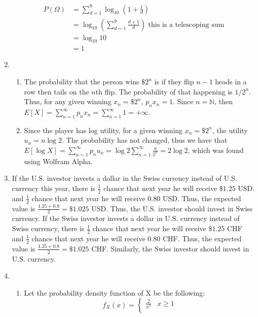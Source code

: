 \documentclass[letterpaper,12pt]{article}
\theoremstyle{definition}
\begin{document}
\begin{enumerate}
      \begin{align*}
        P(\Omega) &= \sum_{d = 1}^9 \log_{10} (1+\frac{1}{d}) \\
        &= \log_{10} (\sum_{d = 1}^9 \frac{d+1}{d}) \text{ this is a telescoping sum} \\
        &= \log_{10} 10 \\
        &= 1
      \end{align*}
  \item
    \begin{enumerate}
      \item
        The probability that the person wins $\$2^n$ is if they flip $n-1$ heads in a row then tails on the $n$th flip. The probability of that happening is $1/2^n$. Thus, for any given winning $x_n = \$2^n$, $p_nx_n = 1$. Since $n = \mathds{N}$, then $E[X] = \sum_{n = 1}^\infty p_nx_n = \sum_{n = 1}^\infty 1 = + \infty$.
      \item
        Since the player has log utility, for a given winning $x_n = \$2^n$, the utility $u_n = n\log{2}$. The probability has not changed, thus we have that $E[\log{X}] = \sum_{n = 1}^\infty p_nu_n = \log{2} \sum_{n = 1}^\infty \frac{n}{2^n} = 2\log{2}$, which was found using Wolfram Alpha.
    \end{enumerate}
  \item
    If the U.S. investor invests a dollar in the Swiss currency instead of U.S. currency this year, there is $\frac{1}{2}$ chance that next year he will receive $\$1.25$ USD. and $\frac{1}{2}$ chance that next year he will receive $0.80$ USD. Thus, the expected value is $\frac{1.25 + 0.8}{2} = \$1.025$ USD. Thus, the U.S. investor should invest in Swiss currency.
    If the Swiss investor invests a dollar in U.S. currency instead of Swiss currency, there is $\frac{1}{2}$ chance that next year he will receive $\$1.25$ CHF and $\frac{1}{2}$ chance that next year he will receive $0.80$ CHF. Thus, the expected value is $\frac{1.25 + 0.8}{2} = \$1.025$ CHF. Similarly, the Swiss investor should invest in U.S. currency.
  \item
    \begin{enumerate}
      Note that for all the following questions, the random variable are all valid since they are continuous (and thus map $[0,1]$ to $\mathds{R}$).
      \item
        Let the probability density function of X be the following:
          \[
            f_X(x) =
            \begin{cases}
              \frac{2}{x^3} & x \geq 1 \\

\end{cases}\]
\end{enumerate}
\end{enumerate}
\end{document}
